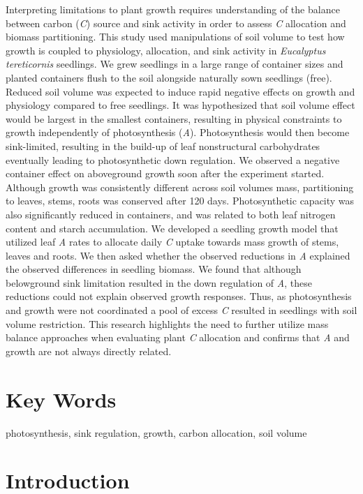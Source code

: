 \documentclass[a4paper]{article}\usepackage[]{graphicx}\usepackage[]{color}
\begin{document}
Interpreting limitations to plant growth requires understanding of the balance between carbon (\textit{C}) source and sink activity in order to assess \textit{C} allocation and biomass partitioning. This study used manipulations of soil volume to test how growth is coupled to physiology, allocation, and sink activity in \textit{Eucalyptus tereticornis} seedlings. We grew seedlings in a large range of container sizes and planted containers flush to the soil alongside naturally sown seedlings (free). Reduced soil volume was expected to induce rapid negative effects on growth and physiology compared to free seedlings. It was hypothesized that soil volume effect would be largest in the smallest containers, resulting in physical constraints to growth independently of photosynthesis (\textit{A}). Photosynthesis would then become sink-limited, resulting in the build-up of leaf nonstructural carbohydrates eventually leading to photosynthetic down regulation. We observed a negative container effect on aboveground growth soon after the experiment started. Although growth was consistently different across soil volumes mass, partitioning to leaves, stems, roots was conserved after 120 days. Photosynthetic capacity was also significantly reduced in containers, and was related to both leaf nitrogen content and starch accumulation. We developed a seedling growth model that utilized leaf \textit{A} rates to allocate daily \textit{C} uptake towards mass growth of stems, leaves and roots. We then asked whether the observed reductions in \textit{A} explained the observed differences in seedling biomass. We found that although belowground sink limitation resulted in the down regulation of \textit{A}, these reductions could not explain observed growth responses. Thus, as photosynthesis and growth were not coordinated a pool of excess \textit{C} resulted in seedlings with soil volume restriction. This research highlights the need to further utilize mass balance approaches when evaluating plant \textit{C} allocation and confirms that \textit{A} and growth are not always directly related.

\section*{Key Words}

photosynthesis, sink regulation, growth, carbon allocation, soil volume


\section*{Introduction}
\end{document}
